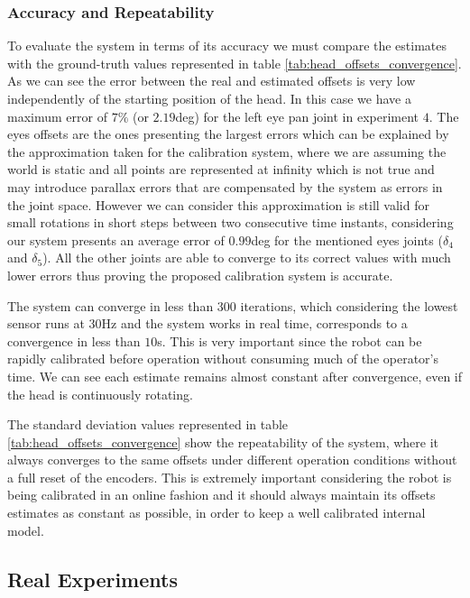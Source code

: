 \subsubsection{Accuracy and Repeatability}

To evaluate the system in terms of its accuracy we must compare the estimates with the ground-truth values represented in table \ref{tab:head_offsets_convergence}. As we can see the error between the real and estimated offsets is very low independently of the starting position of the head. In this case we have a maximum error of $7\%$ (or $2.19$deg) for the left eye pan joint in experiment $4$. The eyes offsets are the ones presenting the largest errors which can be explained by the approximation taken for the calibration system, where we are assuming the world is static and all points are represented at infinity which is not true and may introduce parallax errors that are compensated by the system as errors in the joint space. However we can consider this approximation is still valid for small rotations in short steps between two consecutive time instants, considering our system presents an average error of $0.99$deg for the mentioned eyes joints ($\delta_4$ and $\delta_5$). All the other joints are able to converge to its correct values with much lower errors thus proving the proposed calibration system is accurate. 

The system can converge in less than $300$ iterations, which considering the lowest sensor runs at $30$Hz and the system works in real time, corresponds to a convergence in less than $10$s. This is very important since the robot can be rapidly calibrated before operation without consuming much of the operator's time. We can see each estimate remains almost constant after convergence, even if the head is continuously rotating.

The standard deviation values represented in table \ref{tab:head_offsets_convergence} show the repeatability of the system, where it always converges to the same offsets under different operation conditions without a full reset of the encoders. This is extremely important considering the robot is being calibrated in an online fashion and it should always maintain its offsets estimates as constant as possible, in order to keep a well calibrated internal model. 

\subsection{Real Experiments}\label{sec:real_experiments}

